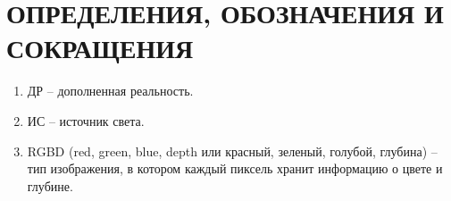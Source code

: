 \chapter*{ОПРЕДЕЛЕНИЯ, ОБОЗНАЧЕНИЯ И СОКРАЩЕНИЯ}

\begin{enumerate}
	\item ДР -- дополненная реальность. 
	\item ИС -- источник света.
	\item RGBD (red, green, blue, depth  или красный, зеленый, голубой, глубина) -- тип изображения, в котором каждый пиксель хранит информацию о цвете и глубине.
\end{enumerate}